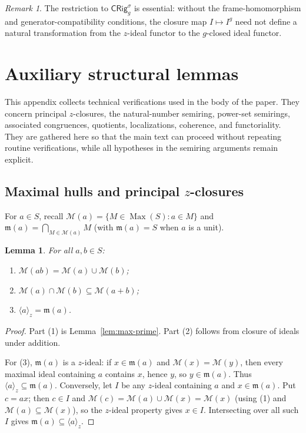 \documentclass[11pt,leqno]{amsart}
\theoremstyle{plain}
\newtheorem{lemma}[theorem]{Lemma}
\theoremstyle{definition}
\theoremstyle{remark}
\newtheorem{remark}[theorem]{Remark}
\numberwithin{equation}{section}
\DeclareMathOperator{\Max}{Max}
\newcommand{\M}{\mathcal M}
\newcommand{\mfrak}{\mathfrak m}
\newcommand{\ideal}[1]{\langle #1\rangle}
\begin{document}
\begin{remark}
The restriction to $\mathsf{CRig}_{g}^{\sigma}$ is essential:
without the frame-homomorphism and generator-compatibility conditions,
the closure map $I\mapsto I^g$ need not define a natural
transformation from the $z$-ideal functor to the $g$-closed ideal
functor.
\end{remark}

\appendix

\section{Auxiliary structural lemmas}\label{app:auxiliary}

This appendix collects technical verifications used in the body of
the paper.
They concern principal $z$-closures, the natural-number semiring,
power-set semirings, associated congruences, quotients,
localizations, coherence, and functoriality.
They are gathered here so that the main text can proceed without
repeating routine verifications, while all hypotheses in the
semiring arguments remain explicit.

\subsection{Maximal hulls and principal
\texorpdfstring{$z$}{z}-closures}

For $a\in S$, recall $\M(a)=\{M\in\Max(S):a\in M\}$
and $\mfrak(a)=\bigcap_{M\in\M(a)}M$ (with $\mfrak(a)=S$
when $a$ is a unit).

\begin{lemma}\label{app:maximal-hull-calculus}
For all $a,b\in S$:
\begin{enumerate}
\item $\M(ab)=\M(a)\cup\M(b)$;
\item $\M(a)\cap\M(b)\subseteq\M(a+b)$;
\item $\ideal{a}_z=\mfrak(a)$.
\end{enumerate}
\end{lemma}
\begin{proof}
Part (1) is Lemma~\ref{lem:max-prime}.
Part (2) follows from closure of ideals under addition.

For (3), $\mfrak(a)$ is a $z$-ideal: if $x\in\mfrak(a)$ and
$\M(x)=\M(y)$, then every maximal ideal containing $a$ contains $x$,
hence $y$, so $y\in\mfrak(a)$.
Thus $\ideal{a}_z\subseteq\mfrak(a)$.
Conversely, let $I$ be any $z$-ideal containing $a$ and
$x\in\mfrak(a)$.
Put $c=ax$; then $c\in I$ and $\M(c)=\M(a)\cup\M(x)=\M(x)$
(using (1) and $\M(a)\subseteq\M(x)$),
so the $z$-ideal property gives $x\in I$.
Intersecting over all such $I$ gives $\mfrak(a)\subseteq\ideal{a}_z$.
\end{proof}
\end{document}
